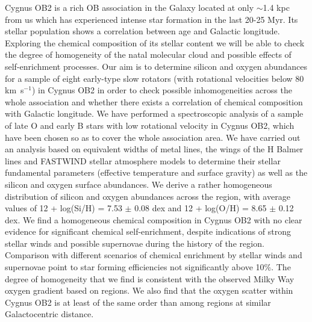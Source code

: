 \documentclass{aa} %
\begin{document}
   \abstract
   { Cygnus OB2 is a rich OB association in the Galaxy located at only $\sim$1.4 kpc from us which has experienced intense star formation in the last 20-25 Myr. Its stellar population shows a correlation between age and Galactic longitude. Exploring the chemical composition of its stellar content we will be able to check the degree of homogeneity of the natal molecular cloud and possible effects of self-enrichment processes.}
   {Our aim is to determine silicon and oxygen abundances for a sample of eight early-type slow rotators (with rotational velocities below 80 km~s$^{-1}$) in Cygnus OB2 in order to check possible inhomogeneities across the whole association and whether there exists a correlation of chemical composition with Galactic longitude.}
   {We have performed a spectroscopic analysis of a sample of late O and early B stars with low rotational velocity in Cygnus OB2, which have been chosen so as to cover the whole association area. We have carried out an analysis based on equivalent widths of metal lines, the wings of the H Balmer lines and FASTWIND stellar atmosphere models to determine their stellar fundamental parameters (effective temperature and surface gravity) as well as the silicon and oxygen surface abundances.}
   {We derive a rather homogeneous distribution of silicon and oxygen abundances across the region, with average values of 12 + log(Si/H) =  7.53 $\pm$ 0.08 dex and 12 + log(O/H) = 8.65 $\pm$ 0.12 dex.}
   {We find a homogeneous chemical composition in Cygnus OB2 with no clear evidence for significant chemical self-enrichment, despite indications of strong stellar winds and possible supernovae during the history of the region. Comparison with different scenarios of chemical enrichment by stellar winds and supernovae point to star forming efficiencies not significantly above 10$\%$. The degree of homogeneity that we find is consistent with the observed Milky Way oxygen gradient based on  regions. We also find that the oxygen scatter within Cygnus OB2 is at least of the same order than among  regions at similar Galactocentric distance.}


\end{document}
